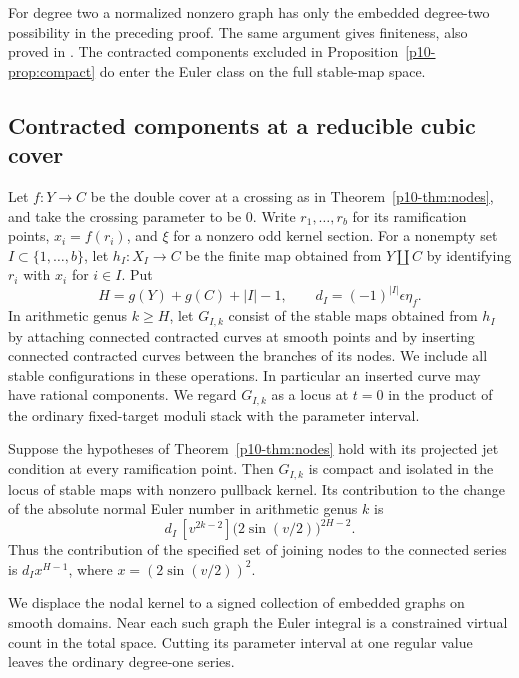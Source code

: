 For degree two a normalized nonzero graph has only the embedded
degree-two possibility in the preceding proof. The same argument
gives finiteness, also proved in \cite[Proposition~3.73]{dw}.
The contracted components excluded in Proposition~\ref{p10-prop:compact}
do enter the Euler class on the full stable-map space.
\subsection{Contracted components at a reducible cubic cover}\label{p10-sec:descendants}

Let $f:Y\to C$ be the double cover at a crossing as in
Theorem~\ref{p10-thm:nodes}, and take the crossing parameter to be $0$.
Write $r_1,\ldots,r_b$ for its ramification points, $x_i=f(r_i)$,
and $\xi$ for a nonzero odd kernel section. For a nonempty set
$I\subset\{1,\ldots,b\}$, let $h_I:X_I\to C$ be the finite map
obtained from $Y\amalg C$ by identifying $r_i$ with $x_i$ for
$i\in I$. Put
\[
 H=g(Y)+g(C)+|I|-1,\qquad d_I=(-1)^{|I|}\epsilon\eta_f .
\]
In arithmetic genus $k\ge H$, let $G_{I,k}$ consist of the stable
maps obtained from $h_I$ by attaching connected contracted curves
at smooth points and by inserting connected contracted curves between
the branches of its nodes. We include all stable configurations in
these operations. In particular an inserted curve may have rational
components. We regard $G_{I,k}$ as a locus at $t=0$ in the product
of the ordinary fixed-target moduli stack with the parameter interval.

\begin{theorem}\label{p10-thm:descendants}
Suppose the hypotheses of Theorem~\ref{p10-thm:nodes} hold with its
projected jet condition at every ramification point. Then $G_{I,k}$
is compact and isolated in the locus of stable maps with nonzero
pullback kernel.
Its contribution to the change of the absolute normal Euler number in
arithmetic genus $k$ is
\begin{equation}\label{p10-eq:desc-contribution}
 d_I\,[v^{2k-2}]\bigl(2\sin(v/2)\bigr)^{2H-2}.
\end{equation}
Thus the contribution of the specified set of joining nodes to the
connected series is $d_I x^{H-1}$, where $x=(2\sin(v/2))^2$.
\end{theorem}

We displace the nodal kernel to a signed collection of embedded
graphs on smooth domains. Near each such graph the Euler integral is
a constrained virtual count in the total space. Cutting its parameter
interval at one regular value leaves the ordinary degree-one series.


